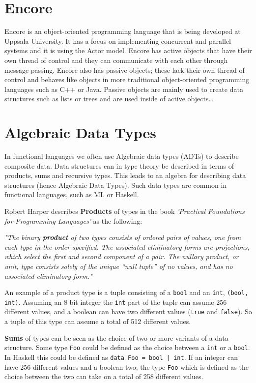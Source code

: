 \documentclass[10pt]{report}
\def\code#1{\texttt{#1}} %
\begin{document}
%
\label{ch:background}
%

\section{Encore}
\par{Encore is an object-oriented programming language that is being developed at Uppsala University\cite{Encore}. It has a focus on implementing concurrent and parallel systems and it is using the Actor model. Encore has active objects that have their own thread of control and they can communicate with each other through message passing. Encore also has passive objects; these lack their own thread of control and behaves like objects in more traditional object-oriented programming languages such as C++ or Java. Passive objects are mainly used to create data structures such as lists or trees and are used inside of active objects\ldots} %
\section{Algebraic Data Types}
\par{In functional languages we often use Algebraic data types (ADTs) to describe composite data. Data structures can in type theory be described in terms of products, sums and recursive types. This leads to an algebra for describing data structures (hence Algebraic Data Types). Such data types are common in functional languages, such as ML or Haskell.}

\par{Robert Harper describes \textbf{Products} of types in the book \textit{'Practical Foundations for Programming Languages'} as the following:}

\par{\textit{"The binary \textbf{product} of two types consists of ordered pairs of values, one from each type in the order specified. The associated eliminatory forms are projections, which select the first and second component of a pair. The nullary product, or unit, type consists solely of the unique “null tuple” of no values, and has no associated eliminatory form."}}
\par{An example of a product type is a tuple consisting of a \code{bool} and an \code{int}, \code{(bool, int)}. Assuming an 8 bit integer the \code{int} part of the tuple can assume 256 different values, and a boolean can have two different values (\code{true} and \code{false}). So a tuple of this type can assume a total of 512 different values.}
\par{\textbf{Sums} of types can be seen as the choice of two or more variants of a data structure. Some type \code{Foo} could be defined as the choice between a \code{int} or a \code{bool}. In Haskell this could be defined as \code{data Foo = bool | int}. If an integer can have 256 different values and a boolean two; the type \code{Foo} which is defined as the choice between the two can take on a total of 258 different values.}
\end{document}
